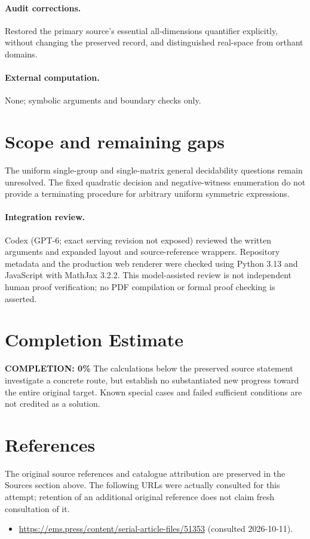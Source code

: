 \documentclass[11pt]{article}
\begin{document}
\paragraph{Audit corrections.} Restored the primary source's essential all-dimensions quantifier explicitly, without changing the preserved record, and distinguished real-space from orthant domains.
\paragraph{External computation.} None; symbolic arguments and boundary checks only.
\section{Scope and remaining gaps}
The uniform single-group and single-matrix general decidability questions remain unresolved. The fixed quadratic decision and negative-witness enumeration do not provide a terminating procedure for arbitrary uniform symmetric expressions.
\paragraph{Integration review.} Codex (GPT-6; exact serving revision not exposed) reviewed the written arguments and expanded layout and source-reference wrappers. Repository metadata and the production web renderer were checked using Python 3.13 and JavaScript with MathJax 3.2.2. This model-assisted review is not independent human proof verification; no PDF compilation or formal proof checking is asserted.

\section{Completion Estimate}
\noindent\textbf{COMPLETION: 0\%}
The calculations below the preserved source statement investigate a concrete route,
but establish no substantiated new progress toward the entire original target.
Known special cases and failed sufficient conditions are not credited as a solution.
\section{References}
The original source references and catalogue attribution are preserved in the
Sources section above. The following URLs were actually consulted for this attempt;
retention of an additional original reference does not claim fresh consultation of it.
\begin{itemize}
\item \url{https://ems.press/content/serial-article-files/51353} (consulted 2026-10-11). 
\end{itemize}
\end{document}
